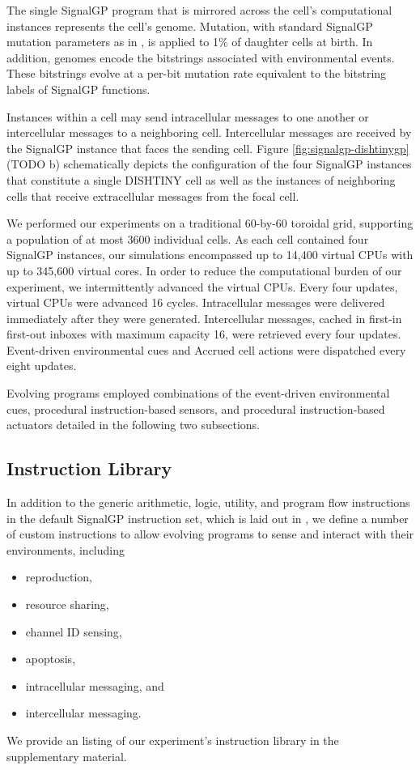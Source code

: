 The single SignalGP program that is mirrored across the cell's computational instances represents the cell's genome.
Mutation, with standard SignalGP mutation parameters as in \cite{lalejini2018evolving}, is applied to 1\% of daughter cells at birth.
In addition, genomes encode the bitstrings associated with environmental events.
These bitstrings evolve at a per-bit mutation rate equivalent to the bitstring labels of SignalGP functions.

Instances within a cell may send intracellular messages to one another or intercellular messages to a neighboring cell.
Intercellular messages are received by the SignalGP instance that faces the sending cell.
Figure \ref{fig:signalgp-dishtinygp}(TODO b) schematically depicts the configuration of the four SignalGP instances that constitute a single DISHTINY cell as well as the instances of neighboring cells that receive extracellular messages from the focal cell.

We performed our experiments on a traditional 60-by-60 toroidal grid, supporting a population of at most 3600 individual cells.
As each cell contained four SignalGP instances, our simulations encompassed up to 14,400 virtual CPUs with up to 345,600 virtual cores.
In order to reduce the computational burden of our experiment, we intermittently advanced the virtual CPUs.
Every four updates, virtual CPUs were advanced 16 cycles.
Intracellular messages were delivered immediately after they were generated.
Intercellular messages, cached in first-in first-out inboxes with maximum capacity 16, were retrieved every four updates.
Event-driven environmental cues and Accrued cell actions were dispatched every eight updates.

Evolving programs employed combinations of the event-driven environmental cues, procedural instruction-based sensors, and procedural instruction-based actuators detailed in the following two subsections.

\subsection{Instruction Library}

In addition to the generic arithmetic, logic, utility, and program flow instructions in the default SignalGP instruction set, which is laid out in \cite{lalejini2018evolving}, we define a number of custom instructions to allow evolving programs to sense and interact with their environments, including
\begin{itemize}
\item reproduction,
\item resource sharing,
\item channel ID sensing,
\item apoptosis,
\item intracellular messaging, and
\item intercellular messaging.
\end{itemize}
We provide an listing of our experiment's instruction library in the supplementary material.

